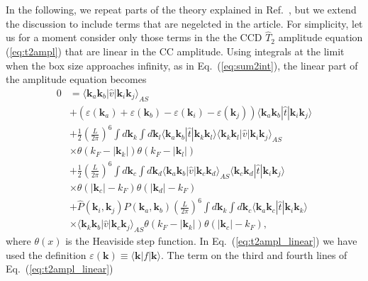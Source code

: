 \documentclass[a4paper,12pt]{report}
\begin{document}
In the following, we repeat parts of the theory explained in 
Ref.~\cite{baardsen}, but we extend the discussion to include terms 
that are negelcted in the article. For simplicity, let us for a 
moment consider only those terms in the the CCD $\hat{T}_{2}$ 
amplitude equation (\ref{eq:t2ampl}) that are linear in the CC 
amplitude. Using integrals at the limit when the box size approaches 
infinity, as in Eq.~(\ref{eq:sum2int}), the linear part of the 
amplitude equation becomes
\begin{align}
  0 &= \langle \mathbf{k}_{a}\mathbf{k}_{b}|\hat{v}|\mathbf{k}_{i}\mathbf{k}_{j}\rangle_{AS} \nonumber \\
  & + \left( \varepsilon(\mathbf{k}_{a})+\varepsilon(\mathbf{k}_{b})-\varepsilon(\mathbf{k}_{i})-\varepsilon(\mathbf{k}_{j}) \right) \langle \mathbf{k}_{a}\mathbf{k}_{b}|\hat{t}|\mathbf{k}_{i}\mathbf{k}_{j}\rangle \nonumber \\
  & + \frac{1}{2}\left( \frac{L}{2\pi }\right)^{6} \int d\mathbf{k}_{k}\int d\mathbf{k}_{l} \langle \mathbf{k}_{a}\mathbf{k}_{b}|\hat{t}|\mathbf{k}_{k}\mathbf{k}_{l}\rangle \langle \mathbf{k}_{k}\mathbf{k}_{l}|\hat{v}|\mathbf{k}_{i}\mathbf{k}_{j}\rangle_{AS} \nonumber \\
  & \times \theta(k_{F}-|\mathbf{k}_{k}|)\theta(k_{F}-|\mathbf{k}_{l}|) \nonumber \\
  & + \frac{1}{2}\left( \frac{L}{2\pi }\right)^{6}\int d\mathbf{k}_{c}\int d\mathbf{k}_{d}\langle \mathbf{k}_{a}\mathbf{k}_{b}|\hat{v}|\mathbf{k}_{c}\mathbf{k}_{d}\rangle_{AS}\langle \mathbf{k}_{c}\mathbf{k}_{d}|\hat{t}|\mathbf{k}_{i}\mathbf{k}_{j}\rangle \nonumber \\
  & \times \theta(|\mathbf{k}_{c}|-k_{F})\theta(|\mathbf{k}_{d}|-k_{F}) \nonumber \\
  & + \hat{P}(\mathbf{k}_{i}, \mathbf{k}_{j})\hat{P}(\mathbf{k}_{a}, \mathbf{k}_{b})\left( \frac{L}{2\pi }\right)^{6}\int d\mathbf{k}_{k}\int d\mathbf{k}_{c}\langle \mathbf{k}_{a}\mathbf{k}_{c}|\hat{t}|\mathbf{k}_{i}\mathbf{k}_{k}\rangle \nonumber \\
  & \times \langle \mathbf{k}_{k}\mathbf{k}_{b}|\hat{v}|\mathbf{k}_{c}\mathbf{k}_{j}\rangle_{AS}\theta(k_{F}-|\mathbf{k}_{k}|)\theta(|\mathbf{k}_{c}|-k_{F}), 
  \label{eq:t2ampl_linear}
\end{align}
where $\theta(x)$ is the Heaviside step function. In 
Eq.~(\ref{eq:t2ampl_linear}) we have used the definition 
$\varepsilon(\mathbf{k}) \equiv \langle \mathbf{k}|f|\mathbf{k}\rangle$. 
The term on the third and fourth lines of Eq.~(\ref{eq:t2ampl_linear}) 
\end{document}

